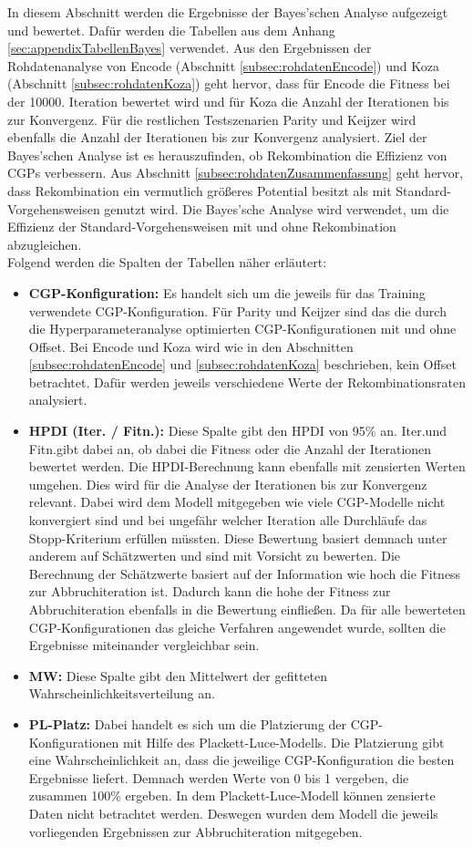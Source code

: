 In diesem Abschnitt werden die Ergebnisse der Bayes'schen Analyse aufgezeigt und bewertet.
Dafür werden die Tabellen aus dem Anhang \ref{sec:appendixTabellenBayes} verwendet.
Aus den Ergebnissen der Rohdatenanalyse von Encode (Abschnitt \ref{subsec:rohdatenEncode}) und Koza (Abschnitt \ref{subsec:rohdatenKoza}) geht hervor, dass für Encode die Fitness bei der 10000. Iteration bewertet wird und für Koza die Anzahl der Iterationen bis zur Konvergenz.
Für die restlichen Testszenarien Parity und Keijzer wird ebenfalls die Anzahl der Iterationen bis zur Konvergenz analysiert.
Ziel der Bayes'schen Analyse ist es herauszufinden, ob Rekombination die Effizienz von CGPs verbessern.
Aus Abschnitt \ref{subsec:rohdatenZusammenfassung} geht hervor, dass Rekombination ein vermutlich größeres Potential besitzt als mit Standard-Vorgehensweisen genutzt wird.
Die Bayes'sche Analyse wird verwendet, um die Effizienz der Standard-Vorgehensweisen mit und ohne Rekombination abzugleichen.\\
Folgend werden die Spalten der Tabellen näher erläutert:
\begin{itemize}
	\item \textbf{CGP-Konfiguration:} Es handelt sich um die jeweils für das Training verwendete CGP-Konfiguration.
	Für Parity und Keijzer sind das die durch die Hyperparameteranalyse optimierten CGP-Konfigurationen mit und ohne Offset.
	Bei Encode und Koza wird wie in den Abschnitten \ref{subsec:rohdatenEncode} und \ref{subsec:rohdatenKoza} beschrieben, kein Offset betrachtet.
	Dafür werden jeweils verschiedene Werte der Rekombinationsraten analysiert.
	\item \textbf{HPDI (Iter. / Fitn.):} Diese Spalte gibt den HPDI von 95\% an.
	\glqq Iter.\grqq\space und \glqq Fitn.\grqq\space gibt dabei an, ob dabei die Fitness oder die Anzahl der Iterationen bewertet werden.
	Die HPDI-Berechnung kann ebenfalls mit zensierten Werten umgehen.
	Dies wird für die Analyse der Iterationen bis zur Konvergenz relevant.
	Dabei wird dem Modell mitgegeben wie viele CGP-Modelle nicht konvergiert sind und bei ungefähr welcher Iteration alle Durchläufe das Stopp-Kriterium erfüllen müssten.
	Diese Bewertung basiert demnach unter anderem auf Schätzwerten und sind mit Vorsicht zu bewerten.
	Die Berechnung der Schätzwerte basiert auf der Information wie hoch die Fitness zur Abbruchiteration ist.
	Dadurch kann die hohe der Fitness zur Abbruchiteration ebenfalls in die Bewertung einfließen.
	Da für alle bewerteten CGP-Konfigurationen das gleiche Verfahren angewendet wurde, sollten die Ergebnisse miteinander vergleichbar sein.
	\item \textbf{MW:} Diese Spalte gibt den Mittelwert der gefitteten Wahrscheinlichkeitsverteilung an.
	\item \textbf{PL-Platz:} Dabei handelt es sich um die Platzierung der CGP-Konfigurationen mit Hilfe des Plackett-Luce-Modells.
	Die Platzierung gibt eine Wahrscheinlichkeit an, dass die jeweilige CGP-Konfiguration die besten Ergebnisse liefert.
	Demnach werden Werte von 0 bis 1 vergeben, die zusammen 100\% ergeben.
	In dem Plackett-Luce-Modell können zensierte Daten nicht betrachtet werden.
	Deswegen wurden dem Modell die jeweils vorliegenden Ergebnissen zur Abbruchiteration mitgegeben.
\end{itemize}
